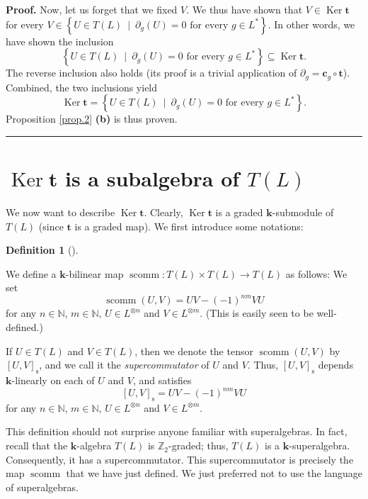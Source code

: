 \documentclass[numbers=enddot,12pt,final,onecolumn,notitlepage]{scrartcl}%
\theoremstyle{definition}
\newtheorem{defi}[theo]{Definition}
\newenvironment{definition}[1][]
{\begin{defi}[#1]\begin{leftbar}}
{\end{leftbar}\end{defi}}
\newenvironment{proof}[1][Proof]{\noindent\textbf{#1.} }{\ \rule{0.5em}{0.5em}}
\begin{document}
\begin{proof}
Now, let us forget that we fixed $V$. We thus have shown that $V\in
\operatorname*{Ker}\mathbf{t}$ for every $V\in\left\{  U\in T\left(  L\right)
\ \mid\ \partial_{g}\left(  U\right)  =0\text{ for every }g\in L^{\ast
}\right\}  $. In other words, we have shown the inclusion%
\[
\left\{  U\in T\left(  L\right)  \ \mid\ \partial_{g}\left(  U\right)
=0\text{ for every }g\in L^{\ast}\right\}  \subseteq\operatorname*{Ker}%
\mathbf{t}.
\]
The reverse inclusion also holds (its proof is a trivial application of
$\partial_{g}=\mathbf{c}_{g}\circ\mathbf{t}$). Combined, the two inclusions
yield
\[
\operatorname*{Ker}\mathbf{t}=\left\{  U\in T\left(  L\right)  \ \mid
\ \partial_{g}\left(  U\right)  =0\text{ for every }g\in L^{\ast}\right\}  .
\]
Proposition \ref{prop.2} \textbf{(b)} is thus proven.
\end{proof}

\section{$\operatorname*{Ker}\mathbf{t}$ is a subalgebra of $T\left(
L\right)  $}

We now want to describe $\operatorname*{Ker}\mathbf{t}$. Clearly,
$\operatorname*{Ker}\mathbf{t}$ is a graded $\mathbf{k}$-submodule of
$T\left(  L\right)  $ (since $\mathbf{t}$ is a graded map). We first introduce
some notations:

\begin{definition}
\label{def.scomm}We define a $\mathbf{k}$-bilinear map $\operatorname*{scomm}%
:T\left(  L\right)  \times T\left(  L\right)  \rightarrow T\left(  L\right)  $
as follows: We set%
\[
\operatorname*{scomm}\left(  U,V\right)  =UV-\left(  -1\right)  ^{nm}VU
\]
for any $n\in\mathbb{N}$, $m\in\mathbb{N}$, $U\in L^{\otimes n}$ and $V\in
L^{\otimes m}$. (This is easily seen to be well-defined.)

If $U\in T\left(  L\right)  $ and $V\in T\left(  L\right)  $, then we denote
the tensor $\operatorname*{scomm}\left(  U,V\right)  $ by $\left[  U,V\right]
_{\operatorname*{s}}$, and we call it the \textit{supercommutator} of $U$ and
$V$. Thus, $\left[  U,V\right]  _{\operatorname*{s}}$ depends $\mathbf{k}%
$-linearly on each of $U$ and $V$, and satisfies%
\[
\left[  U,V\right]  _{\operatorname*{s}}=UV-\left(  -1\right)  ^{nm}VU
\]
for any $n\in\mathbb{N}$, $m\in\mathbb{N}$, $U\in L^{\otimes n}$ and $V\in
L^{\otimes m}$.
\end{definition}

This definition should not surprise anyone familiar with superalgebras. In
fact, recall that the $\mathbf{k}$-algebra $T\left(  L\right)  $ is
$\mathbb{Z}_{2}$-graded; thus, $T\left(  L\right)  $ is a $\mathbf{k}%
$-superalgebra. Consequently, it has a supercommutator. This supercommutator
is precisely the map $\operatorname*{scomm}$ that we have just defined. We
just preferred not to use the language of superalgebras.
\end{document}
